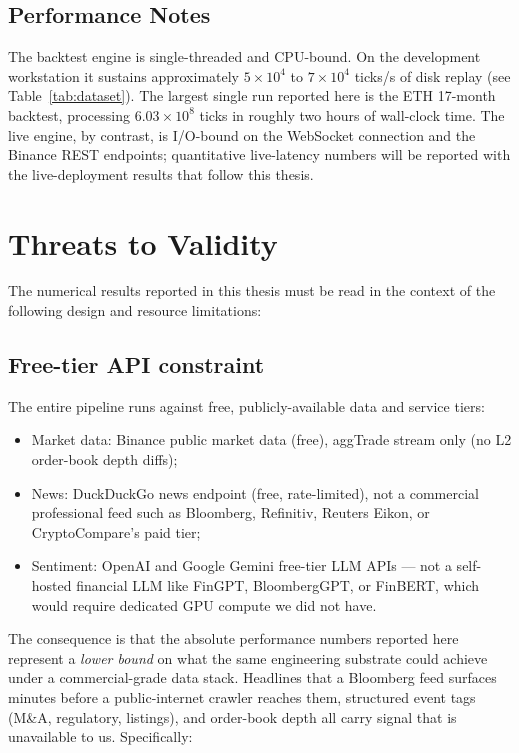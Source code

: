 \documentclass[a4paper, 12pt, titlepage]{article}
\begin{document}
\subsection{Performance Notes}

The backtest engine is single-threaded and CPU-bound. On the
development workstation it sustains approximately
$5\times 10^4$ to $7\times 10^4$ ticks/s of disk replay (see
Table~\ref{tab:dataset}). The largest single run reported here is
the ETH 17-month backtest, processing $6.03\times 10^8$ ticks in
roughly two hours of wall-clock time. The live engine, by contrast,
is I/O-bound on the WebSocket connection and the Binance REST
endpoints; quantitative live-latency numbers will be reported with
the live-deployment results that follow this thesis.

\newpage
\section{Threats to Validity}

The numerical results reported in this thesis must be read in the
context of the following design and resource limitations:

\subsection*{Free-tier API constraint}

The entire pipeline runs against free, publicly-available data and
service tiers:

\begin{itemize}[noitemsep]
    \item Market data: Binance public market data (free), aggTrade
    stream only (no L2 order-book depth diffs);
    \item News: DuckDuckGo news endpoint (free, rate-limited), not
    a commercial professional feed such as Bloomberg, Refinitiv,
    Reuters Eikon, or CryptoCompare's paid tier;
    \item Sentiment: OpenAI and Google Gemini free-tier LLM APIs ---
    not a self-hosted financial LLM like FinGPT, BloombergGPT, or
    FinBERT, which would require dedicated GPU compute we did not
    have.
\end{itemize}

The consequence is that the absolute performance numbers reported
here represent a \emph{lower bound} on what the same engineering
substrate could achieve under a commercial-grade data stack. Headlines
that a Bloomberg feed surfaces minutes before a public-internet
crawler reaches them, structured event tags (M\&A, regulatory,
listings), and order-book depth all carry signal that is
unavailable to us. Specifically:
\end{document}
